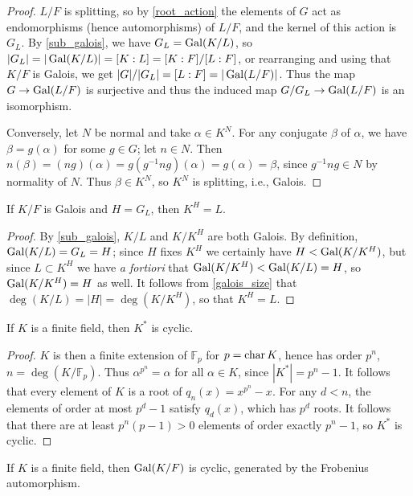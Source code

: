 \begin{proof} $L/F$ is splitting, so by \ref{root_action} the elements of $G$
act as endomorphisms (hence automorphisms) of $L/F$, and the kernel of this action is $G_L$.  By
\ref{sub_galois}, we have $G_L = \operatorname{\text{Gal}}(K/L)$, so $|G_L| = |\operatorname{\text{Gal}}(K/L)| = [K : L] = [K : F] / [L : F]$,
or rearranging and using that $K/F$ is Galois, we get $|G|/|G_L| = [L : F] =
|\operatorname{\text{Gal}}(L/F)|$.  Thus the map $G \to \operatorname{\text{Gal}}(L/F)$ is surjective and thus the induced map $G/G_L \to
\operatorname{\text{Gal}}(L/F)$ is an isomorphism.

Conversely, let $N$ be normal and take $\alpha \in K^N$.  For any conjugate $\beta$ of $\alpha$, we
have $\beta = g(\alpha)$ for some $g \in G$; let $n \in N$.  Then $n(\beta) = (ng)(\alpha) =
g(g^{-1} n g)(\alpha) = g(\alpha) = \beta$, since $g^{-1} n g \in N$ by normality of $N$.  Thus
$\beta \in K^N$, so $K^N$ is splitting, i.e., Galois. \end{proof}

\begin{proposition} If $K/F$ is Galois and $H = G_L$, then $K^H = L$.
\label{fixed_field}
\end{proposition}

\begin{proof} By \ref{sub_galois}, $K/L$ and $K/K^H$ are both Galois.  By
definition, $\operatorname{\text{Gal}}(K/L) = G_L = H$; since $H$ fixes $K^H$ we certainly have
$H < \operatorname{\text{Gal}}(K/K^H)$, but since $L \subset K^H$ we have \emph{a fortiori} that
$\operatorname{\text{Gal}}(K/K^H) < \operatorname{\text{Gal}}(K/L) = H$, so $\operatorname{\text{Gal}}(K/K^H) = H$ as well.  It follows
from \ref{galois_size} that $\deg(K/L) = |H| = \deg(K/K^H)$, so that $K^H =
L$. \end{proof}

\begin{lemma} If $K$ is a finite field, then $K^\ast$ is cyclic.
\label{fin_cyclic}
\end{lemma}

\begin{proof} $K$ is then a finite extension of $\mathbb{F}_p$ for $p =
\operatorname{\text{char}}{K}$, hence has order $p^n$, $n = \deg(K/\mathbb{F}_p)$.  Thus
$\alpha^{p^n} = \alpha$ for all $\alpha \in K$, since $|K^\ast| = p^n - 1$.
It follows that every element of $K$ is a root of $q_n(x) = x^{p^n} - x$.  For
any $d < n$, the elements of order at most $p^d - 1$ satisfy $q_d(x)$, which has
$p^d$ roots.  It follows that there are at least $p^n(p - 1) > 0$ elements of
order exactly $p^n - 1$, so $K^\ast$ is cyclic. \end{proof}

\begin{corollary} If $K$ is a finite field, then $\operatorname{\text{Gal}}(K/F)$ is cyclic, generated by
the Frobenius automorphism.
\label{fin_gal_cyclic}
\end{corollary}

